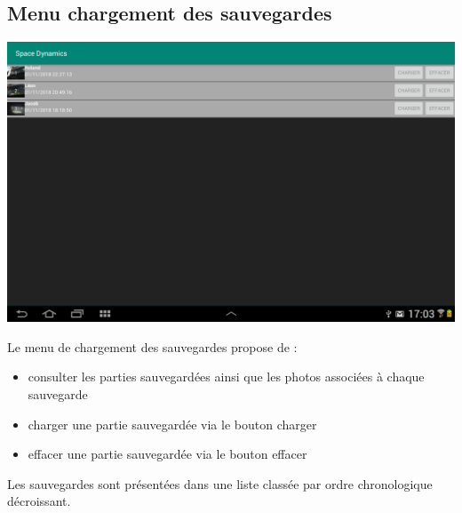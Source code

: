 \documentclass{article}
\begin{document}
\subsection{Menu chargement des sauvegardes}
\begin{center}
\includegraphics[scale=0.25]{LoadGameActivity.png}
\end{center}
Le menu de chargement des sauvegardes propose de :
\begin{itemize}
\item consulter les parties sauvegardées ainsi que les photos associées à chaque sauvegarde
\item charger une partie sauvegardée via le bouton charger
\item effacer une partie sauvegardée via le bouton effacer
\end{itemize}
Les sauvegardes sont présentées dans une liste classée par ordre chronologique décroissant.
\end{document}
